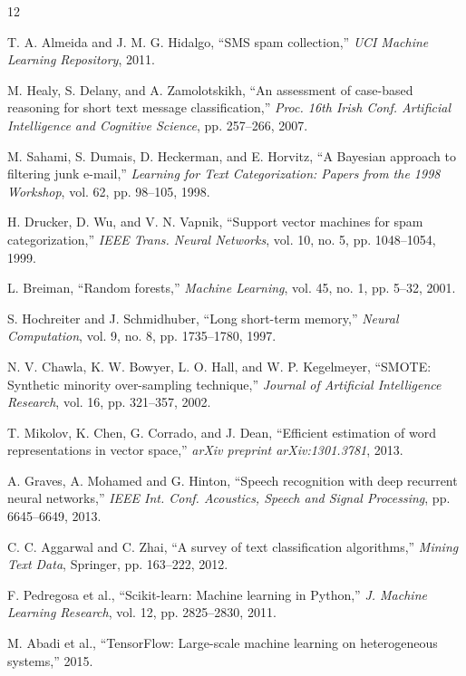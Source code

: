 \documentclass[a4paper,
               ]{jacow}
\begin{document}
\begin{thebibliography}{12} %

T. A. Almeida and J. M. G. Hidalgo,
``SMS spam collection,''
\textit{UCI Machine Learning Repository},
2011.

M. Healy, S. Delany, and A. Zamolotskikh,
``An assessment of case-based reasoning for short text message classification,''
\textit{Proc. 16th Irish Conf. Artificial Intelligence and Cognitive Science},
pp. 257--266, 2007.

M. Sahami, S. Dumais, D. Heckerman, and E. Horvitz,
``A Bayesian approach to filtering junk e-mail,''
\textit{Learning for Text Categorization: Papers from the 1998 Workshop},
vol. 62, pp. 98--105, 1998.

H. Drucker, D. Wu, and V. N. Vapnik,
``Support vector machines for spam categorization,''
\textit{IEEE Trans. Neural Networks},
vol. 10, no. 5, pp. 1048--1054, 1999.

L. Breiman,
``Random forests,''
\textit{Machine Learning},
vol. 45, no. 1, pp. 5--32, 2001.

S. Hochreiter and J. Schmidhuber,
``Long short-term memory,''
\textit{Neural Computation},
vol. 9, no. 8, pp. 1735--1780, 1997.

N. V. Chawla, K. W. Bowyer, L. O. Hall, and W. P. Kegelmeyer,
``SMOTE: Synthetic minority over-sampling technique,''
\textit{Journal of Artificial Intelligence Research},
vol. 16, pp. 321--357, 2002.

T. Mikolov, K. Chen, G. Corrado, and J. Dean,
``Efficient estimation of word representations in vector space,''
\textit{arXiv preprint arXiv:1301.3781},
2013.

A. Graves, A. Mohamed and G. Hinton,
``Speech recognition with deep recurrent neural networks,''
\textit{IEEE Int. Conf. Acoustics, Speech and Signal Processing},
pp. 6645--6649, 2013.

C. C. Aggarwal and C. Zhai,
``A survey of text classification algorithms,''
\textit{Mining Text Data},
Springer, pp. 163--222, 2012.

F. Pedregosa et al.,
``Scikit-learn: Machine learning in Python,''
\textit{J. Machine Learning Research},
vol. 12, pp. 2825--2830, 2011.

M. Abadi et al.,
``TensorFlow: Large-scale machine learning on heterogeneous systems,''
2015.

\end{thebibliography}
\end{document}
